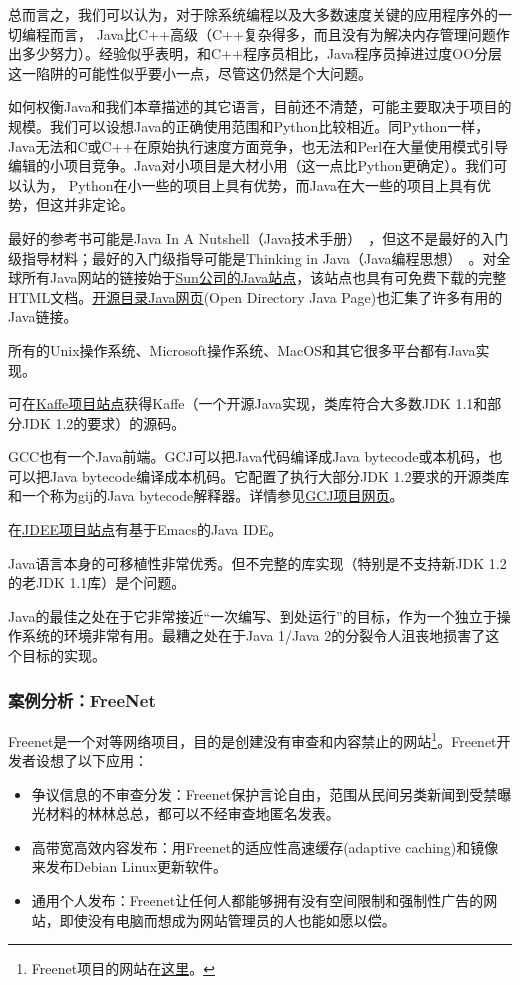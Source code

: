 \documentclass[12pt,oneside]{ctexbook}
\begin{document}
\begin{common-format}
总而言之，我们可以认为，对于除系统编程以及大多数速度关键的应用程序外的一切编程而言， Java比C++高级（C++复杂得多，而且没有为解决内存管理问题作出多少努力）。经验似乎表明，和C++程序员相比，Java程序员掉进过度OO分层这一陷阱的可能性似乎要小一点，尽管这仍然是个大问题。

如何权衡Java和我们本章描述的其它语言，目前还不清楚，可能主要取决于项目的规模。我们可以设想Java的正确使用范围和Python比较相近。同Python一样，Java无法和C或C++在原始执行速度方面竞争，也无法和Perl在大量使用模式引导编辑的小项目竞争。Java对小项目是大材小用（这一点比Python更确定）。我们可以认为，
Python在小一些的项目上具有优势，而Java在大一些的项目上具有优势，但这并非定论。

最好的参考书可能是Java In A Nutshell（Java技术手册）~\cite{FlanaganJava}，但这不是最好的入门级指导材料；最好的入门级指导可能是Thinking in Java（Java编程思想）~\cite{Eckel}。对全球所有Java网站的链接始于\href{http://java.sun.com/}{Sun公司的Java站点}，该站点也具有可免费下载的完整HTML文档。\href{http://dmoz.org/Computers/Programming/Languages/Java/}{开源目录Java网页}(Open Directory Java Page)也汇集了许多有用的Java链接。

所有的Unix操作系统、Microsoft操作系统、MacOS和其它很多平台都有Java实现。

可在\href{http://www.kaffe.org/}{Kaffe项目站点}获得Kaffe（一个开源Java实现，类库符合大多数JDK 1.1和部分JDK 1.2的要求）的源码。

GCC也有一个Java前端。GCJ可以把Java代码编译成Java bytecode或本机码，也可以把Java bytecode编译成本机码。它配置了执行大部分JDK 1.2要求的开源类库和一个称为gij的Java bytecode解释器。详情参见\href{http://gcc.gnu.org/java/}{GCJ项目网页}。

在\href{http://jdee.sunsite.dk/}{JDEE项目站点}有基于Emacs的Java IDE。

Java语言本身的可移植性非常优秀。但不完整的库实现（特别是不支持新JDK 1.2的老JDK 1.1库）是个问题。

Java的最佳之处在于它非常接近“一次编写、到处运行”的目标，作为一个独立于操作系统的环境非常有用。最糟之处在于Java 1/Java 2的分裂令人沮丧地损害了这个目标的实现。


\subsubsection{案例分析：FreeNet}
Freenet是一个对等网络项目，目的是创建没有审查和内容禁止的网站\footnote{Freenet项目的网站在\href{http://freenetproject.org/}{这里}。}。Freenet开发者设想了以下应用：

\begin{itemize}
\item 争议信息的不审查分发：Freenet保护言论自由，范围从民间另类新闻到受禁曝光材料的林林总总，都可以不经审查地匿名发表。
\item  高带宽高效内容发布：用Freenet的适应性高速缓存(adaptive caching)和镜像来发布Debian Linux更新软件。
\item 通用个人发布：Freenet让任何人都能够拥有没有空间限制和强制性广告的网站，即使没有电脑而想成为网站管理员的人也能如愿以偿。
\end{itemize}


\end{common-format}
\end{document}
